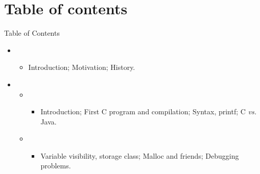 \section{Table of contents}
\begin{frame}[squeeze]{Table of Contents}
  \begin{itemize}
  \item {}
    \begin{itemize}
    \item Introduction; Motivation; History.
    \end{itemize}
    \medskip
  \item[\numberedball{1}] 
    \begin{itemize}
    \item {}
      \begin{itemize}
      \item Introduction; First C program and compilation; Syntax, printf; C
        \textit{vs.} Java.
      \end{itemize}
      
    \item {}
      \begin{itemize}
      \item Variable visibility, storage class; Malloc and friends; Debugging
        problems. 
      \end{itemize}
      

\end{itemize}
\end{itemize}
\end{frame}
